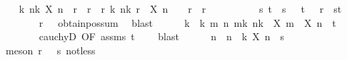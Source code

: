\begin{isabellebody}
\ \ \isamarkupfalse%
\ {\isachardoublequoteopen}{\isasymexists}k{\isachardot}{\kern0pt}\ {\isasymforall}n{\isasymge}k{\isachardot}{\kern0pt}\ X\ n\ {\isasymle}\ r{\isachardoublequoteclose}\ \ r{\isacharcolon}{\kern0pt}\ {\isachardoublequoteopen}{\isasymnot}\ {\isacharparenleft}{\kern0pt}{\isasymexists}r{\isachargreater}{\kern0pt}{}{\isachardot}{\kern0pt}\ {\isasymexists}k{\isachardot}{\kern0pt}\ {\isasymforall}n{\isasymge}k{\isachardot}{\kern0pt}\ r\ {\isacharless}{\kern0pt}\ X\ n{\isacharparenright}{\kern0pt}{\isachardoublequoteclose}\ \ {\isachardoublequoteopen}{}\ {\isacharless}{\kern0pt}\ r{\isachardoublequoteclose}\ \ r\isanewline
\ \ \isamarkupfalse%
\ {\isacharminus}{\kern0pt}\isanewline
\ \ \ \ \isamarkupfalse%
\ s\ t\ \ {\isachardoublequoteopen}s\ {\isachargreater}{\kern0pt}\ {}{\isachardoublequoteclose}\ {\isachardoublequoteopen}t\ {\isachargreater}{\kern0pt}\ {}{\isachardoublequoteclose}\ {\isachardoublequoteopen}r\ {\isacharequal}{\kern0pt}\ s{\isacharplus}{\kern0pt}t{\isachardoublequoteclose}\isanewline
\ \ \ \ \ \ \isamarkupfalse%
\ {\isacartoucheopen}r\ {\isachargreater}{\kern0pt}\ {}{\isacartoucheclose}\ obtain{\isacharunderscore}{\kern0pt}pos{\isacharunderscore}{\kern0pt}sum\ \isamarkupfalse%
\ blast\isanewline
\ \ \ \ \isamarkupfalse%
\ k\ \ k{\isacharcolon}{\kern0pt}\ {\isachardoublequoteopen}{\isasymAnd}m\ n{\isachardot}{\kern0pt}\ {\isasymlbrakk}m{\isasymge}k{\isacharsemicolon}{\kern0pt}\ n{\isasymge}k{\isasymrbrakk}\ {\isasymLongrightarrow}\ {\isasymbar}X\ m\ {\isacharminus}{\kern0pt}\ X\ n{\isasymbar}\ {\isacharless}{\kern0pt}\ t{\isachardoublequoteclose}\isanewline
\ \ \ \ \ \ \isamarkupfalse%
\ cauchyD\ {\isacharbrackleft}{\kern0pt}OF\ assms\ {\isacartoucheopen}t\ {\isachargreater}{\kern0pt}\ {}{\isacartoucheclose}{\isacharbrackright}{\kern0pt}\ \isamarkupfalse%
\ blast\isanewline
\ \ \ \ \isamarkupfalse%
\ n\ \ {\isachardoublequoteopen}n\ {\isasymge}\ k{\isachardoublequoteclose}\ {\isachardoublequoteopen}X\ n\ {\isasymle}\ s{\isachardoublequoteclose}\isanewline
\ \ \ \ \ \ \isamarkupfalse%
\ {\isacharparenleft}{\kern0pt}meson\ r\ {\isacartoucheopen}{}\ {\isacharless}{\kern0pt}\ s{\isacartoucheclose}\ not{\isacharunderscore}{\kern0pt}less{\isacharparenright}{\kern0pt}\isanewline

\end{isabellebody}
